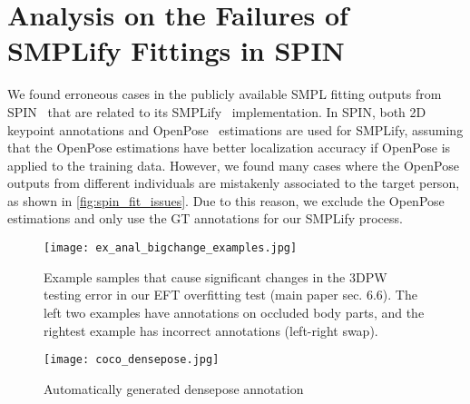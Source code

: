 \documentclass[10pt,twocolumn,letterpaper]{article}
\begin{document}
	\section{Analysis on the Failures of SMPLify Fittings in SPIN}
	\label{section:simplify_issue}
	We found erroneous cases in the publicly available SMPL fitting outputs from SPIN~\cite{kolotouros2019spin} that are related to its SMPLify~\cite{Bogo2016} implementation. In SPIN, both 2D keypoint annotations and OpenPose~\cite{cao2018openpose} estimations are used for SMPLify, assuming that the OpenPose estimations have better localization accuracy if OpenPose is applied to the training data. However, we found many cases where the OpenPose outputs from different individuals are mistakenly associated to the target person, as shown in \cref{fig:spin_fit_issues}. Due to this reason, we exclude the OpenPose estimations and only use the GT annotations for our SMPLify process.  
	
	
	\begin{figure}[t]
		\centering
		\texttt{[image: ex\_anal\_bigchange\_examples.jpg]}
		\caption{Example samples that cause significant changes in the 3DPW testing error in our EFT overfitting test (main paper sec. 6.6)\@.
			The left two examples have annotations on occluded body parts, and the rightest example has incorrect annotations (left-right swap).}\label{fig:exemplar_analysis_vis}
	\end{figure}
	
	
	\begin{figure}[t]
		\centering
		\texttt{[image: coco\_densepose.jpg]}
		\caption{Automatically generated densepose annotation}\label{fig:densepose_render}
	\end{figure}
	
	
	
\end{document}

